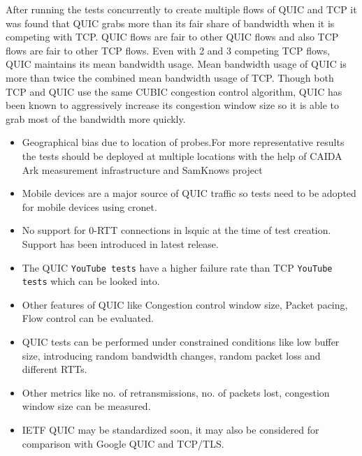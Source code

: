 \begin{frame}[allowframebreaks]
After running the tests concurrently to create multiple flows of QUIC and TCP it was found that QUIC grabs more than its fair share of bandwidth when it is competing with TCP. QUIC flows are fair to other QUIC flows and also TCP flows are fair to other TCP flows. Even with 2 and 3 competing TCP flows, QUIC maintains its mean bandwidth usage.
Mean bandwidth usage of QUIC is more than twice the combined mean bandwidth usage of TCP. Though both TCP and QUIC use the same CUBIC congestion control algorithm, QUIC has been known to aggressively increase its congestion window size so it is able to grab most of the bandwidth more quickly. 

\end{frame}
\clearpage


\begin{frame}
\begin{itemize}
    
    \item Geographical bias due to location of probes.For more representative results the tests should be deployed at multiple locations with the help of CAIDA Ark \cite{CAIDAArk} measurement infrastructure and SamKnows project\cite{SamKnowsproject}
    
    \item Mobile devices are a major source of QUIC traffic so tests need to be adopted for mobile devices using cronet\cite{cronet}.
    
    \item No support for 0-RTT connections in lsquic at the time of test creation. Support has been introduced in latest release.
    
    \item The QUIC \texttt{YouTube tests} have a higher failure rate than TCP \texttt{YouTube tests} which can be looked into.
    
    \item Other features of QUIC like Congestion control window size, Packet pacing, Flow control can be evaluated.
    
    \item  QUIC tests can be performed under constrained conditions like low buffer size, introducing random bandwidth changes, random packet loss and different RTTs.
    
    \item  Other metrics like no. of retransmissions, no. of packets lost, congestion window size can be measured.
    
    \item IETF QUIC may be standardized soon, it may also be considered for comparison with Google QUIC and TCP/TLS.
    

\end{itemize}
\end{frame}
\clearpage
